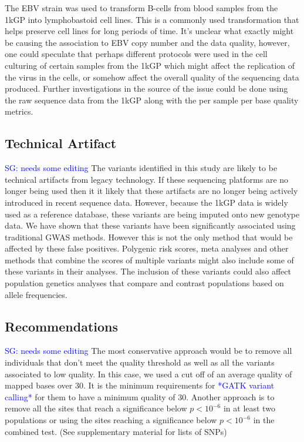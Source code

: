 \documentclass[9pt,lineno]{elife}
\newcommand{\sgcomment}[1]{\textcolor{blue}{SG: #1}}
\newcommand{\todo}[1]{\textcolor{blue}{*#1*}}
\begin{document}
The EBV strain was used to transform B-cells from blood samples from the 1kGP into lymphobastoid cell lines.
This is a commonly used transformation that helps preserve cell lines for long periods of time.
It's unclear what exactly might be causing the association to EBV copy number and the data quality, however, one could speculate that perhaps different protocols were used in the cell culturing of certain samples from the 1kGP which might affect the replication of the virus in the cells, or somehow affect the overall quality of the sequencing data produced.
Further investigations in the source of the issue could be done using the raw sequence data from the 1kGP along with the per sample per base quality metrics. 			

\subsection{Technical Artifact}
\sgcomment{needs some editing}
The variants identified in this study are likely to be technical artifacts from legacy technology.
If these sequencing platforms are no longer being used then it it likely that these artifacts are no longer being actively introduced in recent sequence data.
However, because the 1kGP data is widely used as a reference database, these variants are being imputed onto new genotype data.
We have shown that these variants have been significantly associated using traditional GWAS methods.
However this is not the only method that would be affected by these false positives. 
Polygenic risk scores, meta analyses and other methods that combine the scores of multiple variants might also include some of these variants in their analyses.
The inclusion of these variants could also affect population genetics analyses that compare and contrast populations based on allele frequencies.

\subsection{Recommendations}
\sgcomment{needs some editing}
The most conservative approach would be to remove all individuals that don't meet the quality threshold as well as all the variants associated to low quality.
In this case, we used a cut off of an average quality of mapped bases over 30. 
It is the minimum requirements for \todo{GATK variant calling} for them to have a minimum quality of 30.
Another approach is to remove all the sites that reach a significance below $ p < 10^{-6}$ in at least two populations or using the sites reaching a significance below $ p < 10^{-6}$ in the combined test. (See supplementary material for lists of SNPs)
\end{document}
